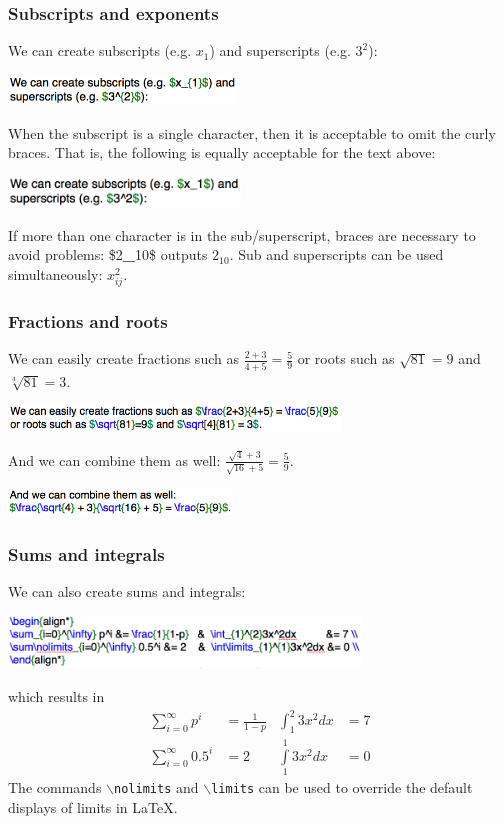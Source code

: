 \begin{frame} \frametitle{Subscripts and exponents}
	We can create subscripts (e.g. $x_1$) and superscripts (e.g. $3^2$):
	\begin{center}
		\includegraphics[height=8mm]{math/images/subSuperscript}
	\end{center}
	When the subscript is a single character, then it is acceptable to omit the curly braces. That is, the following is equally acceptable for the text above:
	\begin{center}
		\includegraphics[height=8mm]{math/images/subSuperscriptNoBraces}
	\end{center}
	If more than one character is in the sub/superscript, braces are necessary to avoid problems: {\color{braces}\${\color{black}2\textbf{\_}10}\$} outputs $2_10$. Sub and superscripts can be used simultaneously: $x_{ij}^2$.
\end{frame}

\begin{frame} \frametitle{Fractions and roots}
	We can easily create fractions such as $\frac{2+3}{4+5} = \frac{5}{9}$ or roots such as $\sqrt{81}=9$ and $\sqrt[4]{81} = 3$.
	\begin{center}
		\includegraphics[height=7mm]{math/images/fracRoots}
	\end{center}
	And we can combine them as well:
	$\frac{\sqrt{4} + 3}{\sqrt{16} + 5} = \frac{5}{9}$.
	\begin{center}
		\includegraphics[height=7mm]{math/images/fracRootsCombined}
	\end{center}
\end{frame}

\begin{frame} \frametitle{Sums and integrals}
	We can also create sums and integrals:
	\begin{center}
		\includegraphics[height=14mm]{math/images/sumIntegral}
	\end{center}
	which results in
	\begin{align*}
	\sum_{i=0}^{\infty} p^i &= \frac{1}{1-p}   &  \int_{1}^{2}3x^2dx          &= 7 \\
	\sum\nolimits_{i=0}^{\infty} 0.5^i &= 2    &  \int\limits_{1}^{1}3x^2dx &= 0
	\end{align*}
	The commands \texttt{\color{command}$\backslash$nolimits} and \texttt{\color{command}$\backslash$limits} can be used to override the default displays of limits in LaTeX.
\end{frame}


